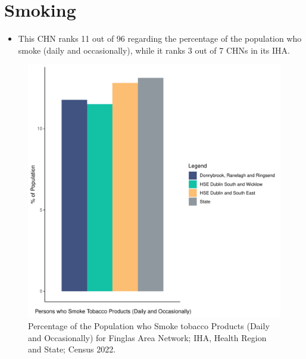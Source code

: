 \documentclass{article}
\begin{document}
\pagebreak

\section{Smoking}\label{sect:Smoking}
\begin{itemize}
\item This CHN ranks  11 out of 96 regarding the percentage of the population who smoke (daily and occasionally), while it ranks   3 out of 7 CHNs in its IHA.
\end{itemize}
\begin{figure}[H]
	\centering
	\includegraphics[width = 120mm]{../figures/SmokingED.pdf}
	\caption{Percentage of the Population who Smoke tobacco Products (Daily and Occasionally) for Finglas Area Network; IHA, Health Region and State; Census 2022.}
	\label{fig:2ae19629-1a6a-13a3-e055-000000000001}
	\end{figure}
	
\end{document}
